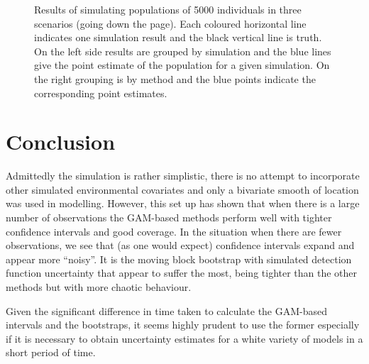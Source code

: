\documentclass[11pt]{amsart}
\begin{document}
\begin{figure}
\begin{center}
{\begin{tabular}{c}
\end{tabular}
}%
\caption{Results of simulating populations of 5000 individuals in three scenarios (going down the page). Each coloured horizontal line indicates one simulation result and the black vertical line is truth. On the left side results are grouped by simulation and the blue lines give the point estimate of the population for a given simulation. On the right grouping is by method and the blue points indicate the corresponding point estimates.}
\label{res-500}
\end{center}
\end{figure}

\section{Conclusion}

Admittedly the simulation is rather simplistic, there is no attempt to incorporate other simulated environmental covariates and only a bivariate smooth of location was used in modelling. However, this set up has shown that when there is a large number of observations the GAM-based methods perform well with tighter confidence intervals and good coverage. In the situation when there are fewer observations, we see that (as one would expect) confidence intervals expand and appear more ``noisy''. It is the moving block bootstrap with simulated detection function uncertainty that appear to suffer the most, being tighter than the other methods but with more chaotic behaviour.

Given the significant difference in time taken to calculate the GAM-based intervals and the bootstraps, it seems highly prudent to use the former especially if it is necessary to obtain uncertainty estimates for a white variety of models in a short period of time.


\end{document}
